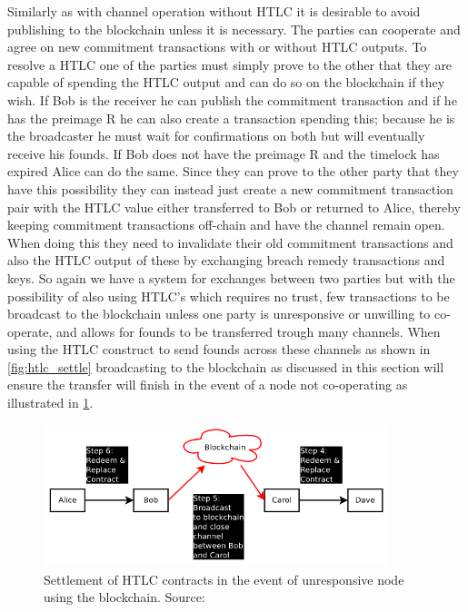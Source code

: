 Similarly as with channel operation without HTLC it is desirable to avoid publishing to the blockchain unless it is necessary. The parties can cooperate and agree on new commitment transactions with or without HTLC outputs. To resolve a HTLC one of the parties must simply prove to the other that they are capable of spending the HTLC output and can do so on the blockchain if they wish. If Bob is the receiver he can publish the commitment transaction and if he has the preimage R he can also create a transaction spending this; because he is the broadcaster he must wait for confirmations on both but will eventually receive his founds. If Bob does not have the preimage R and the timelock has expired Alice can do the same. Since they can prove to the other party that they have this possibility they can instead just create a new commitment transaction pair with the HTLC value either transferred to Bob or returned to Alice, thereby keeping  commitment transactions off-chain and have the channel remain open. When doing this they need to invalidate their old commitment transactions and also the HTLC output of these by exchanging breach remedy transactions and keys. So again we have a system for exchanges between two parties but with the possibility of also using HTLC's which requires no trust, few transactions to be broadcast to the blockchain unless one party is unresponsive or unwilling to co-operate, and allows for founds to be transferred trough many channels.  
When using the HTLC construct to send founds across these channels as shown in \cref{fig:htlc_settle} broadcasting to the blockchain as discussed in this section will ensure the transfer will finish in the event of a node not co-operating as illustrated in \cref{fig:htlc_bc}.

\begin{figure}[h]
    \centering
    \includegraphics[width=10cm]{figures/htlc_bc.png}
    \caption{ Settlement of HTLC contracts in the event of unresponsive node using the blockchain. Source: \cite{poon2015bitcoin}}
    \label{fig:htlc_bc}
\end{figure}

